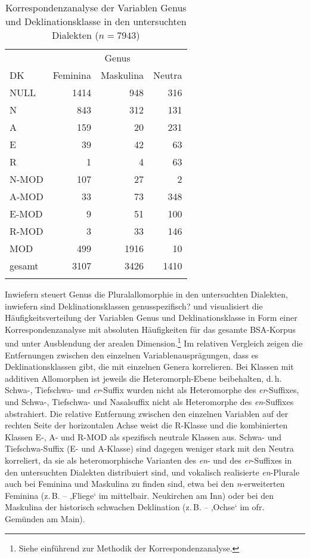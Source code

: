 \begin{table}
    \begin{tabular}{lrrr}
    \lsptoprule
         &  \multicolumn{3}{c}{Genus}\\
         \cmidrule(lr){2-4}
        DK & Feminina & Maskulina & Neutra\\
        \midrule
        NULL & 1414 & 948 & 316\\
        N & 843 & 312 & 131\\
        A & 159 & 20 & 231\\
        E & 39 & 42 & 63\\
        R & 1 & 4 & 63 \\
        N-MOD & 107 & 27 & 2\\
        A-MOD & 33 & 73 & 348\\
        E-MOD & 9 & 51 & 100\\
        R-MOD & 3 & 33 & 146\\
        MOD & 499 & 1916 & 10\\
        \midrule
        gesamt & 3107 & 3426 & 1410\\
        \lspbottomrule
    \end{tabular}
    \caption{Korrespondenzanalyse der Variablen Genus und Deklinationsklasse in den untersuchten Dialekten ($n=7943$)}
    \label{tabfig:13}
\end{table}

Inwiefern steuert Genus die Pluralallomorphie in den untersuchten Dialekten, inwiefern sind Deklinationsklassen genusspezifisch?   und  visualisiert die Häufigkeitsverteilung der Variablen Genus und Deklinationsklasse in Form einer Korrespondenzanalyse mit absoluten Häufigkeiten für das gesamte BSA-Korpus und unter Ausblendung der arealen Dimension.\footnote{Siehe einführend  zur Methodik der Korrespondenzanalyse.}  Im relativen Vergleich zeigen die Entfernungen zwischen den einzelnen Variablenausprägungen, dass es Deklinationsklassen gibt, die mit einzelnen Genera korrelieren. Bei Klassen mit additiven Allomorphen ist jeweils die Heteromorph-Ebene beibehalten, d.\,h. Schwa-, Tiefschwa- und \textit{er}{}-Suffix wurden nicht als Heteromorphe des \textit{er}{}-Suffixes, und Schwa-, Tiefschwa- und Nasalsuffix nicht als Heteromorphe des \textit{en}{}-Suffixes abstrahiert. Die relative Entfernung zwischen den einzelnen Variablen auf der rechten Seite der horizontalen Achse weist die R-Klasse und die kombinierten Klassen E-, A- und R-MOD als spezifisch neutrale Klassen aus. Schwa- und Tiefschwa-Suffix (E- und A-Klasse) sind dagegen weniger stark mit den Neutra korreliert, da sie als heteromorphische Varianten des \textit{en}{}- und des \textit{er}{}-Suffixes in den untersuchten Dialekten distribuiert sind, und vokalisch realisierte \textit{en}{}-Plurale auch bei Feminina und Maskulina zu finden sind, etwa bei den \textit{n}{}-erweiterten Feminina (z.\,B.  --  ‚Fliege‘ im mittelbair. Neukirchen am Inn) oder bei den Maskulina der historisch schwachen Deklination (z.\,B.  --   ‚Ochse‘ im ofr. Gemünden am Main).

